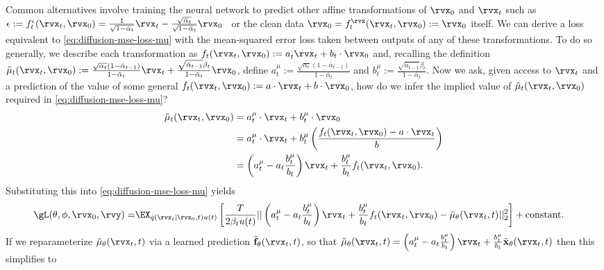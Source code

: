 Common alternatives involve training the neural network to predict other affine transformations of $\rvx_0$ and $\rvx_t$ such as $\epsilon := f_t^\epsilon(\rvx_t, \rvx_0) = \frac{1}{\sqrt{1-\bar{\alpha}_t}} \rvx_t - \frac{\sqrt{\bar{\alpha}_t}}{\sqrt{1-\bar{\alpha}_t}} \rvx_0$~\citep{ho2020denoising} or the clean data $\rvx_0 = f_t^\rvx(\rvx_t, \rvx_0) := \rvx_0$ itself. We can derive a loss equivalent to \cref{eq:diffusion-mse-loss-mu} with the mean-squared error loss taken between outputs of any of these transformations. To do so generally, we describe each transformation as $f_t(\rvx_t, \rvx_0) := a_t^ \cdot \rvx_t + b_t \cdot \rvx_0$ and, recalling the definition $\tilde{\mathbf{\mu}}_t(\rvx_t,\rvx_0) := \frac{\sqrt{\alpha_t}(1-\bar{\alpha}_{t-1})}{1-\bar{\alpha}_t}\rvx_t + \frac{\sqrt{\bar{\alpha}_{t-1}}\beta_t}{1-\bar{\alpha}_t}\rvx_0$, define $a_t^\mu := \frac{\sqrt{\alpha_t}(1-\bar{\alpha}_{t-1})}{1-\bar{\alpha}_t}$ and $b_t^\mu := \frac{\sqrt{\bar{\alpha}_{t-1}}\beta_t}{1-\bar{\alpha}_t}$. Now we ask, given access to $\rvx_t$ and a prediction of the value of some general $f_t(\rvx_t, \rvx_0) := a \cdot \rvx_t + b \cdot \rvx_0$, how do we infer the implied value of $\tilde{\mathbf{\mu}}_t(\rvx_t,\rvx_0)$ required in \cref{eq:diffusion-mse-loss-mu}?
\begin{align}
    \tilde{\mathbf{\mu}}_t(\rvx_t,\rvx_0) &= a_t^\mu \cdot \rvx_t + b_t^\mu \cdot \rvx_0 \\
    &= a_t^\mu \cdot \rvx_t + b_t^\mu \left( \frac{f_t(\rvx_t, \rvx_0) - a \cdot \rvx_t}{b} \right) \\
    &= \left( a_t^\mu - a_t \frac{b_t^\mu}{b_t} \right) \rvx_t + \frac{b_t^\mu}{b_t} f_t(\rvx_t, \rvx_0).
\end{align}
Substituting this into \cref{eq:diffusion-mse-loss-mu} yields
\begin{align}
    \gL(\theta, \phi, \rvx_0, \rvy) =& \EX_{q(\rvx_t|\rvx_0,t)u(t)} \left[ \frac{T}{2 \beta_t u(t)} || \left( a_t^\mu - a_t \frac{b_t^\mu}{b_t} \right) \rvx_t + \frac{b_t^\mu}{b_t} f_t(\rvx_t, \rvx_0) - \tilde{\mathbf{\mu}}_\theta(\rvx_t, t) ||_2^2 \right] + \text{constant}.
\end{align}
If we reparameterize $\tilde{\mathbf{\mu}}_\theta(\rvx_t, t)$ via a learned prediction $\tilde{\mathbf{f}}_\theta(\rvx_t, t)$, so that $\tilde{\mathbf{\mu}}_\theta(\rvx_t, t) = \left( a_t^\mu - a_t \frac{b_t^\mu}{b_t} \right) \rvx_t + \frac{b_t^\mu}{b_t} \tilde{\mathbf{x}}_\theta(\rvx_t, t)$ then this simplifies to

